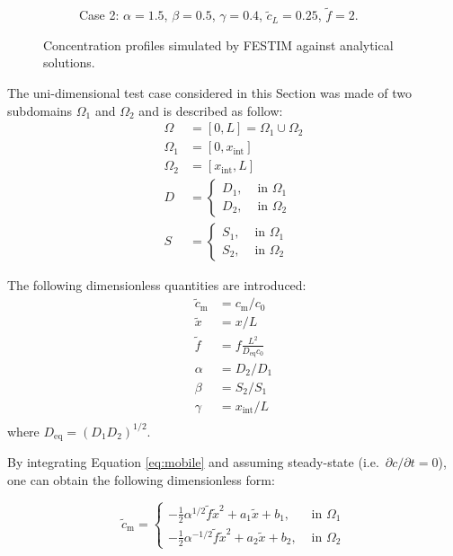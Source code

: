 \begin{figure} [h]
\begin{subfigure}{0.5\linewidth}
        \caption{Case 2:  $\alpha = 1.5$, $\beta = 0.5$, $\gamma=0.4$, $\tilde{c}_L = 0.25$, $\tilde{f}=2$.}
    \end{subfigure}
    \caption{Concentration profiles simulated by FESTIM against analytical solutions.}
    \label{fig:comparison MES}
\end{figure}

The uni-dimensional test case considered in this Section was made of two subdomains $\Omega_1$ and $\Omega_2$ and is described as follow:
\begin{subequations}
\begin{align}
    \Omega &= [0, L] = \Omega_1 \cup \Omega_2 \\
    \Omega_1 &= [0, x_\mathrm{int}] \\
    \Omega_2 &= [x_\mathrm{int}, L] \\
    D &= \begin{cases}
        D_1,& \text{ in } \Omega_1\\
        D_2,& \text{ in } \Omega_2
    \end{cases} \\
    S &= \begin{cases}
        S_1,& \text{ in } \Omega_1\\
        S_2,& \text{ in } \Omega_2
    \end{cases}
\end{align}
\end{subequations}

The following dimensionless quantities are introduced:
\begin{subequations}
    \begin{align}
        \tilde{c}_\mathrm{m} &= c_\mathrm{m} / c_0\\
        \tilde{x} &= x / L \\
        \tilde{f} &= f \frac{L^2}{D_\mathrm{eq} c_0} \\
        \alpha &= D_2/D_1 \\
        \beta &= S_2/S_1 \\
        \gamma &= x_\mathrm{int}/L\\
    \end{align} 
\end{subequations}
where $D_\mathrm{eq} = (D_1 D_2)^{1/2}$.

By integrating Equation \ref{eq:mobile} and assuming steady-state (i.e.\ $\partial c/\partial t=0$), one can obtain the following dimensionless form:

\begin{equation}
        \tilde{c}_\mathrm{m}= 
\begin{cases}
    -\frac{1}{2}\alpha^{1/2}\tilde{f} \tilde{x}^2 + a_1 \tilde{x} + b_1,& \text{ in } \Omega_1\\
    -\frac{1}{2}\alpha^{-1/2}\tilde{f} \tilde{x}^2 + a_2 \tilde{x} + b_2,& \text{ in } \Omega_2
\end{cases}
\label{eq:MES c}
\end{equation}

